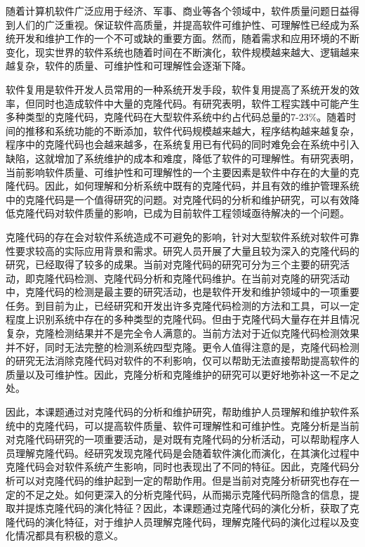 



随着计算机软件广泛应用于经济、军事、商业等各个领域中，软件质量问题日益得到人们的广泛重视。保证软件高质量，并提高软件可维护性、可理解性已经成为系统开发和维护工作的一个不可或缺的重要方面。然而，随着需求和应用环境的不断变化，现实世界的软件系统也随着时间在不断演化，软件规模越来越大、逻辑越来越复杂，软件的质量、可维护性和可理解性会逐渐下降。

软件复用是软件开发人员常用的一种系统开发手段，软件复用提高了系统开发的效率，但同时也造成软件中大量的克隆代码。有研究表明，软件工程实践中可能产生多种类型的克隆代码，克隆代码在大型软件系统中约占代码总量的7-23\%。随着时间的推移和系统功能的不断添加，软件代码规模越来越大，程序结构越来越复杂，程序中的克隆代码也会越来越多，在系统复用已有代码的同时难免会在系统中引入缺陷，这就增加了系统维护的成本和难度，降低了软件的可理解性。有研究表明，当前影响软件质量、可维护性和可理解性的一个主要因素是软件中存在的大量的克隆代码。因此，如何理解和分析系统中既有的克隆代码，并且有效的维护管理系统中的克隆代码是一个值得研究的问题。对克隆代码的分析和维护研究，可以有效降低克隆代码对软件质量的影响，已成为目前软件工程领域亟待解决的一个问题。

克隆代码的存在会对软件系统造成不可避免的影响，针对大型软件系统对软件可靠性要求较高的实际应用背景和需求。研究人员开展了大量且较为深入的克隆代码的研究，已经取得了较多的成果。当前对克隆代码的研究可分为三个主要的研究活动，即克隆代码检测、克隆代码分析和克隆代码维护。在当前对克隆的研究活动中，克隆代码的检测是最主要的研究活动，也是软件开发和维护领域中的一项重要任务。到目前为止，已经研究和开发出许多克隆代码检测的方法和工具，可以一定程度上识别系统中存在的多种类型的克隆代码。但由于克隆代码大量存在并且情况复杂，克隆检测结果并不是完全令人满意的。当前方法对于近似克隆代码检测效果并不好，同时无法完整的检测系统四型克隆。更令人值得注意的是，克隆代码检测的研究无法消除克隆代码对软件的不利影响，仅可以帮助无法直接帮助提高软件的质量以及可维护性。因此，克隆分析和克隆维护的研究可以更好地弥补这一不足之处。

因此，本课题通过对克隆代码的分析和维护研究，帮助维护人员理解和维护软件系统中的克隆代码，可以提高软件质量、软件可理解性和可维护性。克隆分析是当前对克隆代码研究的一项重要活动，是对既有克隆代码的分析活动，可以帮助程序人员理解克隆代码。经研究发现克隆代码是会随着软件演化而演化，在其演化过程中克隆代码会对软件系统产生影响，同时也表现出了不同的特征。因此，克隆代码分析可以对克隆代码的维护起到一定的帮助作用。但是当前对克隆分析研究也存在一定的不足之处。如何更深入的分析克隆代码，从而揭示克隆代码所隐含的信息，提取并提炼克隆代码的演化特征？因此，本课题通过克隆代码的演化分析，获取了克隆代码的演化特征，对于维护人员理解克隆代码，理解克隆代码的演化过程以及变化情况都具有积极的意义。

